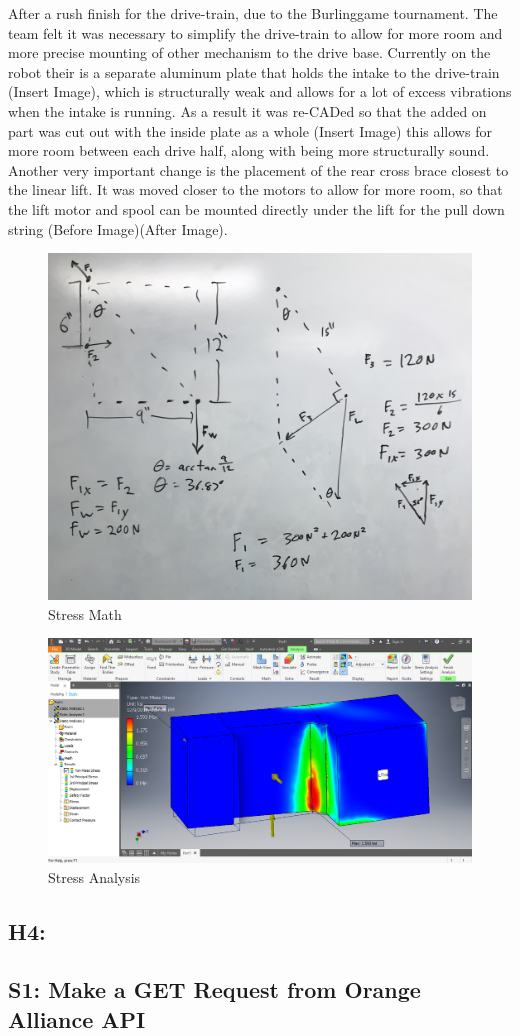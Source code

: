 \documentclass{article}
\begin{document}
{After a rush finish for the drive-train, due to the Burlinggame tournament. The team felt it was necessary to simplify the drive-train to allow for more room and more precise mounting of other mechanism to the drive base. Currently on the robot their is a separate aluminum plate that holds the intake to the drive-train (Insert Image), which is structurally  weak and allows for a lot of excess vibrations when the intake is running. As a result it was re-CADed so that the added on part was cut out with the inside plate as a whole (Insert Image) this allows for more room between each drive half, along with being more structurally sound. Another very important change is the placement of the rear cross brace closest to the linear lift. It was moved closer to the motors to allow for more room, so that the lift motor and spool can be mounted directly under the lift for the pull down string (Before Image)(After Image). 
\begin{figure}
    \centering
    \includegraphics[width=.6 \textwidth]{14_12-03/images/Math.jpg}
    \caption{Stress Math}
    \label{fig:math}
\end{figure}

\begin{figure}
    \centering
    \includegraphics[width=.6\textwidth]{14_12-03/images/Stress_Analysis.png}
    \caption{Stress Analysis}
    \label{fig:stress}
\end{figure}
\subsection{H4: }
}\subsection{S1: Make a GET Request from Orange Alliance API}
\end{document}
